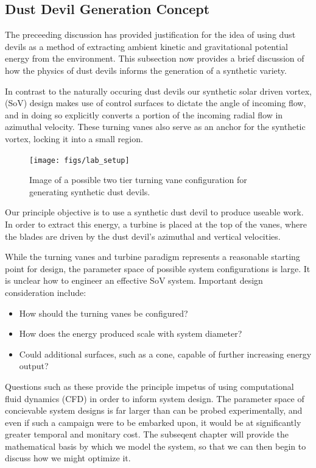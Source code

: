\subsection{Dust Devil Generation Concept}

The preceeding discussion has provided justification for the idea of
using dust devils as a method of extracting ambient kinetic and
gravitational potential energy from the environment. This  
subsection now provides a brief discussion of how the physics of 
dust devils informs the generation of a synthetic variety. 

In contrast to the naturally occuring dust devils
our synthetic solar driven vortex, (SoV) design makes use of
control surfaces to dictate the
angle of incoming flow, and in doing so explicitly converts a portion of
the incoming radial flow in azimuthal velocity. These turning vanes also
serve as an anchor for the synthetic vortex, locking it into a small
region.  
  \begin{figure}[!htb]
    \begin{center}
     \texttt{[image: figs/lab\_setup]}
     \caption{Image of a possible two tier turning vane 
       configuration for generating synthetic dust devils.}
     \label{fig:cartoon}
    \end{center}
  \end{figure}

Our principle objective is to use a synthetic dust devil to produce 
useable work. In order to extract this energy, a turbine is placed 
at the top of the vanes, where the blades are driven by the dust devil's 
azimuthal and vertical velocities. 

While the turning vanes and turbine  
paradigm represents a reasonable starting point for design, the
parameter space of possible system configurations is large. It is
unclear how to engineer an effective SoV system. Important design
consideration include: 
\begin{itemize}
  \item How should the turning vanes be configured?
  \item How does the energy produced scale with system diameter?
  \item Could additional surfaces, such as a cone, capable of further 
    increasing energy output?
\end{itemize}

Questions such as these provide the principle impetus of using
computational fluid dynamics (CFD) in order to inform system design. The
parameter space of concievable system designs is far larger than can be
probed experimentally, and even if such a campaign were to be embarked
upon, it would be at significantly greater temporal and monitary
cost. The subseqent chapter will provide the mathematical basis by which
we model the system, so that we can then begin to discuss how we might
optimize it.  



